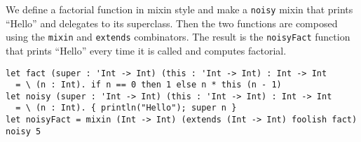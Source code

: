 We define a factorial function in mixin style and make a \lstinline{noisy} mixin
that prints ``Hello'' and delegates to its superclass. Then the two functions
are composed using the \lstinline{mixin} and \lstinline{extends} combinators.
The result is the \lstinline{noisyFact} function that prints ``Hello'' every
time it is called and computes factorial.
\begin{lstlisting}
let fact (super : 'Int -> Int) (this : 'Int -> Int) : Int -> Int
  = \ (n : Int). if n == 0 then 1 else n * this (n - 1)
let noisy (super : 'Int -> Int) (this : 'Int -> Int) : Int -> Int
  = \ (n : Int). { println("Hello"); super n }
let noisyFact = mixin (Int -> Int) (extends (Int -> Int) foolish fact)
noisy 5
\end{lstlisting}

